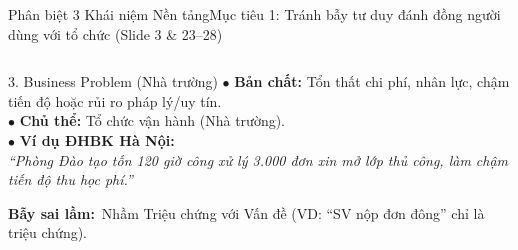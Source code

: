 \documentclass[aspectratio=169, 10pt]{beamer}
\begin{document}
\begin{frame}[t]{Phân biệt 3 Khái niệm Nền tảng}{Mục tiêu 1: Tránh bẫy tư duy đánh đồng người dùng với tổ chức (Slide 3 \& 23--28)}
\begin{columns}[T]
      \begin{infoCard}{3. Business Problem (Nhà trường)}
        \scriptsize
        $\bullet$ \textbf{Bản chất:} Tổn thất chi phí, nhân lực, chậm tiến độ hoặc rủi ro pháp lý/uy tín.\\
        $\bullet$ \textbf{Chủ thể:} Tổ chức vận hành (Nhà trường).\\
        $\bullet$ \textbf{Ví dụ ĐHBK Hà Nội:}\\\textit{``Phòng Đào tạo tốn 120 giờ công xử lý 3.000 đơn xin mở lớp thủ công, làm chậm tiến độ thu học phí.''}\\[0.1cm]
        \begin{tcolorbox}[colback=teal!5!white, colframe=SecondaryTeal!50, arc=1mm, boxrule=0.4pt, left=1mm, right=1mm, top=1mm, bottom=1mm]
          \tiny\textbf{Bẫy sai lầm:}\ Nhầm Triệu chứng với Vấn đề (VD: ``SV nộp đơn đông'' chỉ là triệu chứng).
        \end{tcolorbox}
      \end{infoCard}
  \end{columns}
\end{frame}
\end{document}

